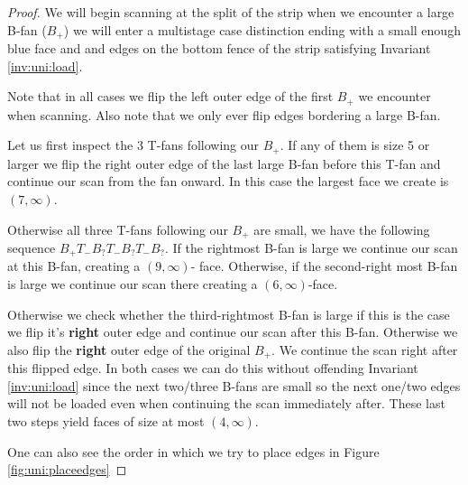 \begin{proof}
  We will begin scanning at the split of the strip when we encounter a large B-fan ($B_+$) we  will enter a multistage case distinction ending with a small enough blue face and and edges on the bottom fence of the strip satisfying Invariant \ref{inv:uni:load}.

  Note that in all cases we flip the left outer edge of the first $B_+$ we encounter when scanning. Also note that we only ever flip edges bordering a large B-fan.


  Let us first inspect the 3 T-fans following our $B_+$. If any of them is size 5 or larger we flip the right outer edge of the last large B-fan before this T-fan and continue our scan from the fan onward. In this case the largest face we create is $(7, \infty)$.

  Otherwise all three T-fans following our $B_+$ are small, we have the following sequence $B_+ T_- B_? T_- B_? T_- B_?$. If the rightmost B-fan is large we continue our scan at this B-fan, creating a $(9, \infty)$- face. Otherwise, if the second-right most B-fan is large we continue our scan there creating a $(6, \infty)$-face.

  Otherwise we check whether the third-rightmost B-fan is large if this is the case we flip it's \textbf{right} outer edge and continue our scan after this B-fan. Otherwise we also flip the \textbf{right} outer edge of the original $B_+$. We continue the scan right after this flipped edge. In both cases we can do this without offending Invariant \ref{inv:uni:load} since the next two/three B-fans are small so the next one/two edges will not be loaded even when continuing the scan immediately after. These last two steps yield faces of size at most $(4, \infty)$.

  One can also see the order in which we try to place edges in Figure \ref{fig:uni:placeedges}


\end{proof}
